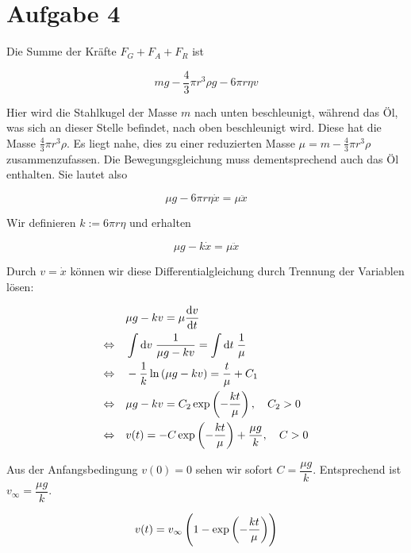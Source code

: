 \documentclass[a4paper,german,12pt,smallheadings]{scrartcl}
\begin{document}
\section*{Aufgabe 4}

Die Summe der Kräfte  $F_G + F_A + F_R$ ist

\begin{equation}
  mg - \frac{4}{3} \pi r^3 \rho g - 6 \pi r \eta v
\end{equation}

Hier wird die Stahlkugel der Masse $m$ nach unten beschleunigt, während das Öl,
was sich an dieser Stelle befindet, nach oben beschleunigt wird. Diese hat die
Masse $\frac{4}{3} \pi r^3 \rho$. Es liegt nahe, dies zu einer reduzierten
Masse $\mu = m - \frac{4}{3} \pi r^3 \rho$ zusammenzufassen. Die
Bewegungsgleichung muss dementsprechend auch das Öl enthalten. Sie lautet also

\begin{equation}
  \mu g - 6 \pi r \eta \dot{x} = \mu \ddot{x}
\end{equation}

Wir definieren $k := 6 \pi r \eta$ und erhalten

\begin{equation}
  \mu g - k \dot{x} = \mu \ddot{x}
\end{equation}

Durch $v = \dot{x}$ können wir diese Differentialgleichung durch Trennung der
Variablen lösen:

\begin{align*}
  &\mu g - k v = \mu \frac{\dif v}{\dif t} \\
  \Leftrightarrow \quad &
  \int \dif v \; \frac{1}{\mu g - kv} = \int \dif t \; \frac{1}{\mu} \\
  \Leftrightarrow \quad &
  -\frac{1}{k} \ln \del{\mu g - kv} = \frac{t}{\mu} + C_1 \\
  \Leftrightarrow \quad &
  \mu g - kv = C_2 \exp \del{- \frac{kt}{\mu} }, \quad C_2 > 0 \\
  \Leftrightarrow \quad &
  v(t) = -C \exp \del{- \frac{kt}{\mu} } + \frac{\mu g}{k}, \quad C > 0
\end{align*}

Aus der Anfangsbedingung $v(0) = 0$ sehen wir sofort $C = \dfrac{\mu g}{k}$.
Entsprechend ist $v_\infty = \dfrac{\mu g}{k}$.

\begin{equation}
  v(t) = v_\infty \del{1 - \exp\del{-\frac{k t}{\mu}}}
\end{equation}
\end{document}
